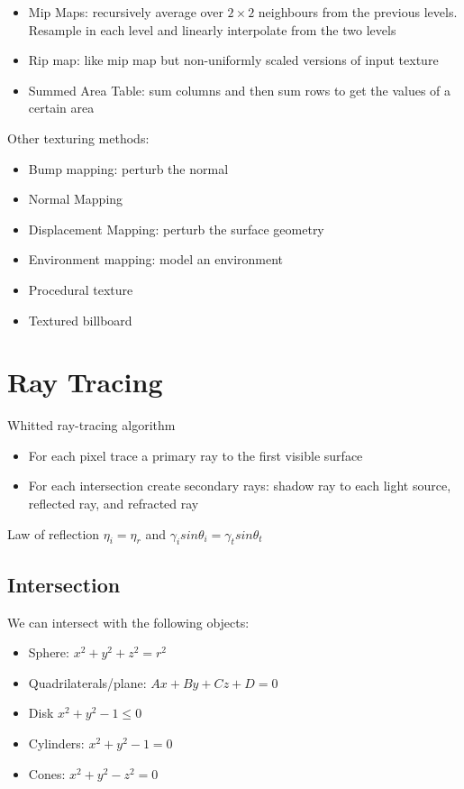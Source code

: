 \documentclass[a4paper]{article}
\begin{document}
\begin{itemize}
    \item Mip Maps: recursively average over $2\times 2$ neighbours from the previous levels. Resample in each level and linearly interpolate from the two levels
    \item Rip map: like mip map but non-uniformly scaled versions of input texture
    \item Summed Area Table: sum columns and then sum rows to get the values of a certain area
\end{itemize}

Other texturing methods:
\begin{itemize}
    \item Bump mapping: perturb the normal
    \item Normal Mapping
    \item Displacement Mapping: perturb the surface geometry
    \item Environment mapping: model an environment
    \item Procedural texture
    \item Textured billboard
\end{itemize}

\section{Ray Tracing}
Whitted ray-tracing algorithm
\begin{itemize}
    \item For each pixel trace a primary ray to the first visible surface
    \item For each intersection create secondary rays: shadow ray to each light source, reflected ray, and refracted ray
\end{itemize}

Law of reflection $\eta_i = \eta_r$ and $\gamma_i sin \theta_i = \gamma_t sin \theta_t$  

\subsection{Intersection}
We can intersect with the following objects:
\begin{itemize}
    \item Sphere: $x^2 + y^2 + z^2 = r^2$
    \item Quadrilaterals/plane: $Ax + By + Cz + D = 0 $  
    \item Disk $x^2 + y^2 - 1 \leq 0$ 
    \item Cylinders: $x^2 +y^2 - 1 =0$ 
    \item Cones: $x^2 + y^2 - z^2 = 0$ 
\end{itemize}
\end{document}

